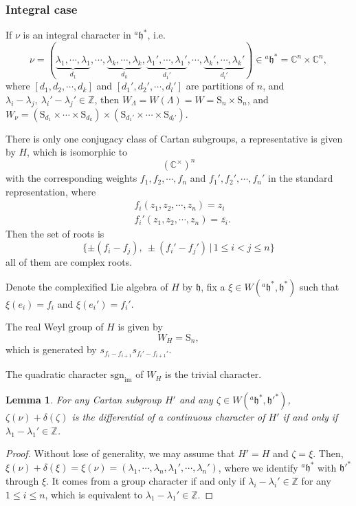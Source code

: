 \documentclass[12pt, a4paper]{amsart}
\numberwithin{equation}{section}
\newtheorem{lem}[thm]{Lemma}
\newcommand{\BC}{{\mathbb {C}}}
\newcommand{\BZ}{{\mathbb {Z}}}
\newcommand{\fh}{\mathfrak{h}}
\newcommand{\sgn}{{\mathrm{sgn}}}
\newcommand{\set}[2]{\{#1\,|\,#2\}}
\renewcommand{\bar}{\overline}
\begin{document}
\subsubsection{Integral case}
If $\nu$ is an integral character in $^{a}\fh^*$, i.e. 
$$\nu =  (\underbrace{\lambda_1, \cdots, \lambda_1}_{d_1}, \cdots, \underbrace{\lambda_k, \cdots, \lambda_k}_{d_k}, \underbrace{\lambda_1', \cdots, \lambda_1'}_{d_1'}, \cdots, \underbrace{\lambda_k', \cdots, \lambda_k'}_{d_{l}'} ) \in {^{a}\fh^*} = \BC^n \times \BC^n,$$ 
where $[d_1,d_2,\cdots,d_k]$ and $[d_1',d_2',\cdots,d_l']$ are partitions of $n$, and $\lambda_i - \lambda_j, \ \lambda_i' - \lambda_j' \in \BZ$, then $W_{\Lambda} =W(\Lambda) = W = \mathrm{S}_n \times \mathrm{S}_n$, and $W_\nu = (\mathrm{S}_{d_1} \times \cdots \times \mathrm{S}_{d_k}) \times (\mathrm{S}_{d_1'} \times \cdots \times \mathrm{S}_{d_l'})$. 

There is only one conjugacy class of Cartan subgroups, a representative is given by $H$, which is isomorphic to
$$(\BC^\times)^n$$
with the corresponding weights $f_1,f_2,\cdots,f_n$ and $f_1',f_2',\cdots,f_n'$ in the standard representation, where
\begin{align}
    & f_i(z_1,z_2,\cdots,z_n) = z_i\\
    & f_i'(z_1,z_2,\cdots,z_n) = \bar{z_i}.
\end{align}
Then the set of roots is 
$$\set{\pm(f_i - f_j), \ \pm(f_i'-f_j')}{1\leq i< j \leq n}$$
all of them are complex roots.

Denote the complexified Lie algebra of $H$ by $\fh$, fix a $\xi \in W({^{a}\fh^*},\fh^*)$ such that $\xi(e_i) = f_i$ and $\xi(e_i') = f_i'$.

The real Weyl group of $H$ is given by
$$W_H = \mathrm{S}_n,$$
which is generated by $s_{f_i-f_{i+1}}s_{f_i'-f_{i+1}'}$. 

The quadratic character $\sgn_{\mathrm{im}}$ of $W_{H}$ is the trivial character.

\begin{lem}
    For any Cartan subgroup $H'$ and any $\zeta \in W({^{a}\fh^*,\fh'^*})$, $\zeta(\nu) + \delta(\zeta)$ is the differential of a continuous character of $H'$ if and only if $\lambda_1 - \lambda_1' \in \BZ$.
\end{lem}

\begin{proof}
    Without lose of generality, we may assume that $H' = H$ and $\zeta = \xi$. Then, $\xi(\nu) + \delta(\xi) = \xi(\nu) = (\lambda_1,\cdots,\lambda_n,\lambda_1',\cdots,\lambda_n')$, where we identify ${^{a}\fh^*}$ with $\fh'^*$ through $\xi$. It comes from a group character if and only if $\lambda_i - \lambda_i' \in \BZ$ for any $1 \leq i \leq n$, which is equivalent to $\lambda_1 - \lambda_1' \in \BZ$.
\end{proof}
\end{document}

